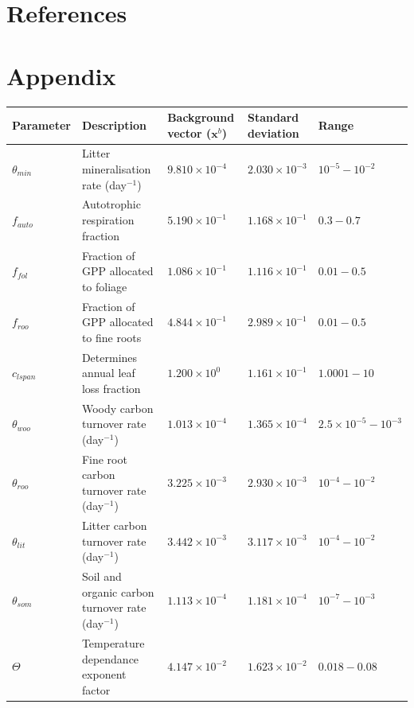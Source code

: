 \documentclass[review]{elsarticle}
\begin{document}
\section*{References}



\newpage

\section*{Appendix}

\begin{table}[ht] 
\begin{center}
	\begin{tabular}{| l | l | l | l | l |}
	\hline
	Parameter & Description & \pbox{7cm}{Background\\ vector ($\textbf{x}^{b}$)} & \pbox{7cm}{Standard \\deviation} & Range \\ \hline
$\theta_{min}$ & Litter mineralisation rate (day$^{-1}$) & $9.810\times 10^{-4}$ & $2.030\times 10^{-3}$ & $10^{-5} - 10^{-2}$ \\ \hline
$f_{auto}$ & Autotrophic respiration fraction & $5.190\times 10^{-1}$ & $1.168\times 10^{-1}$ & $0.3 - 0.7$  \\ \hline
$f_{fol}$ & Fraction of GPP allocated to foliage & $1.086\times 10^{-1}$ & $1.116\times 10^{-1}$ & $0.01-0.5$ \\ \hline
$f_{roo}$ & Fraction of GPP allocated to fine roots & $4.844\times 10^{-1}$ & $2.989\times 10^{-1}$ & $0.01-0.5$ \\ \hline
$c_{lspan}$ & Determines annual leaf loss fraction & $1.200\times 10^{0} $ & $1.161\times 10^{-1}$ & $1.0001 - 10$ \\ \hline
$\theta_{woo}$ & Woody carbon turnover rate (day$^{-1}$) & $1.013\times 10^{-4}$ & $1.365\times 10^{-4}$ & $2.5\times10^{-5} - 10^{-3}$ \\ \hline
$\theta_{roo}$ & Fine root carbon turnover rate (day$^{-1}$) & $3.225\times 10^{-3}$ & $2.930\times 10^{-3}$ & $10^{-4} - 10^{-2}$ \\ \hline
$\theta_{lit}$ & Litter carbon turnover rate (day$^{-1}$) & $3.442\times 10^{-3}$ & $3.117\times 10^{-3}$ & $10^{-4} - 10^{-2}$ \\ \hline
$\theta_{som}$ & Soil and organic carbon turnover rate (day$^{-1}$) & $1.113\times 10^{-4}$ & $1.181\times 10^{-4}$ & $10^{-7} - 10^{-3}$ \\ \hline
$\Theta$ & Temperature dependance exponent factor & $4.147\times 10^{-2}$ & $1.623\times 10^{-2}$ & $0.018 - 0.08$ \\ \hline

\end{tabular}
\end{center}
\end{table}
\end{document}
